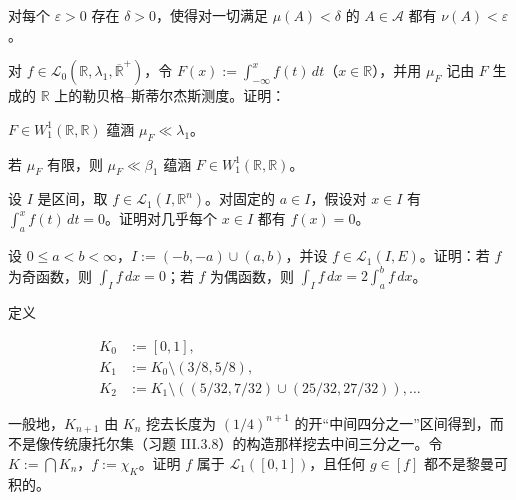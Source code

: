 \begin{exercises}
\begin{subitems}
对每个 $ \varepsilon > 0 $ 存在 $ \delta > 0 $，使得对一切满足 $ \mu(A) < \delta $ 的 $ A \in \mathcal{A} $ 都有 $ \nu(A) < \varepsilon $。

\end{subitems}

\item

对 $ f \in \mathcal{L}_0(\mathbb{R},\lambda_1,\overline{\mathbb{R}}^+) $，令 $ F(x) := \int_{-\infty}^{x} f(t) \, dt $（$ x \in \mathbb{R} $），并用 $ \mu_F $ 记由 $ F $ 生成的 $ \mathbb{R} $ 上的勒贝格–斯蒂尔杰斯测度。证明：

\begin{items}
\item

$ F \in W_1^1(\mathbb{R},\mathbb{R}) $ 蕴涵 $ \mu_F \ll \lambda_1 $。

\item

若 $ \mu_F $ 有限，则 $ \mu_F \ll \beta_1 $ 蕴涵 $ F \in W_1^1(\mathbb{R},\mathbb{R}) $。

\end{items}

\item

设 $ I $ 是区间，取 $ f \in \mathcal{L}_1(I,\mathbb{R}^n) $。对固定的 $ a \in I $，假设对 $ x \in I $ 有 $ \int_a^x f(t) \, dt = 0 $。证明对几乎每个 $ x \in I $ 都有 $ f(x) = 0 $。

\item

设 $ 0 \le a < b < \infty $，$ I := (-b,-a) \cup (a,b) $，并设 $ f \in \mathcal{L}_1(I,E) $。证明：若 $ f $ 为奇函数，则 $ \int_I f \, dx = 0 $；若 $ f $ 为偶函数，则 $ \int_I f \, dx = 2 \int_a^b f \, dx $。

\item

定义

\begin{equation*}
\begin{aligned}
K_0 &:= [0,1] , \\ K_1 &:= K_0 \setminus (3/8, 5/8) , \\ K_2 &:= K_1 \setminus ((5/32, 7/32) \cup (25/32, 27/32)) , \ldots
\end{aligned}
\end{equation*}

一般地，$ K_{n+1} $ 由 $ K_n $ 挖去长度为 $ (1/4)^{n+1} $ 的开“中间四分之一”区间得到，而不是像传统康托尔集（习题 III.3.8）的构造那样挖去中间三分之一。令 $ K := \bigcap K_n $，$ f := \chi_K $。证明 $ f $ 属于 $ \mathcal{L}_1([0,1]) $，且任何 $ g \in [f] $ 都不是黎曼可积的。

\end{exercises}


